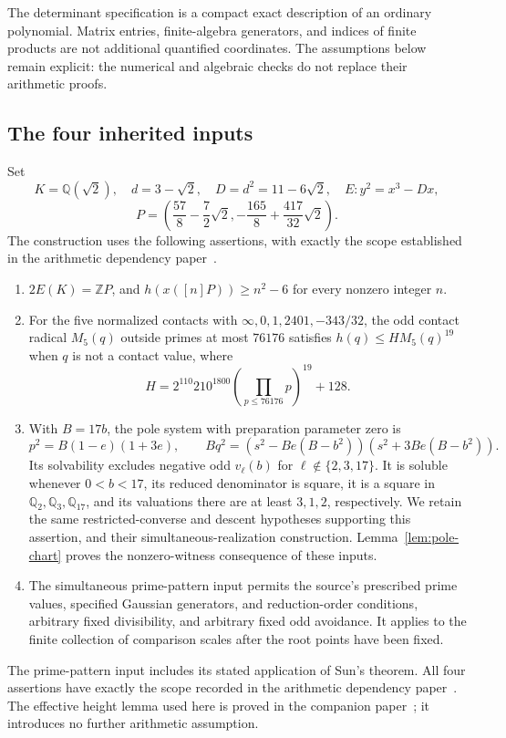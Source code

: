 \documentclass[11pt,a4paper]{article}
\newcommand{\Q}{\mathbb Q}\newcommand{\Z}{\mathbb Z}
\begin{document}
The determinant specification is a compact exact description of an
ordinary polynomial. Matrix entries, finite-algebra generators, and
indices of finite products are not additional quantified coordinates.
The assumptions below remain explicit: the numerical and algebraic
checks do not replace their arithmetic proofs.

\subsection{The four inherited inputs}\label{sec:inputs}

Set
\[
 K=\Q(\sqrt2),\quad d=3-\sqrt2,\quad D=d^2=11-6\sqrt2,
 \quad E:y^2=x^3-Dx,
\]
\[
 P=\left(\frac{57}{8}-\frac72\sqrt2,
          -\frac{165}{8}+\frac{417}{32}\sqrt2\right).
\]
The construction uses the following assertions, with exactly the
scope established in the arithmetic dependency paper~\cite{Dependencies}.
\begin{enumerate}
\item $2E(K)=\Z P$, and $h(x([n]P))\ge n^2-6$ for every
      nonzero integer $n$.
\item For the five normalized contacts with
      $\infty,0,1,2401,-343/32$, the odd contact radical
      $M_5(q)$ outside primes at most $76176$ satisfies
      $h(q)\le H M_5(q)^{19}$ when $q$ is not a contact value,
      where
\[
 H=2^{110}210^{1800}\left(\prod_{p\le76176}p\right)^{19}+128.
\]
\item With $B=17b$, the pole system with preparation parameter
      zero is
\[
 p^2=B(1-e)(1+3e),\qquad
 Bq^2=(s^2-Be(B-b^2))(s^2+3Be(B-b^2)).
\]
      Its solvability excludes negative odd $v_\ell(b)$ for
      $\ell\notin\{2,3,17\}$. It is soluble whenever
      $0<b<17$, its reduced denominator is square, it is a
      square in $\Q_2,\Q_3,\Q_{17}$, and its valuations there
      are at least $3,1,2$, respectively. We retain the same
      restricted-converse and descent hypotheses supporting this
      assertion, and their simultaneous-realization construction.
      Lemma~\ref{lem:pole-chart} proves the nonzero-witness
      consequence of these inputs.
\item The simultaneous prime-pattern input permits the source's
      prescribed prime values, specified Gaussian generators, and reduction-order
      conditions, arbitrary fixed divisibility, and arbitrary
      fixed odd avoidance. It applies to the finite collection
      of comparison scales after the root points have been fixed.
\end{enumerate}
The prime-pattern input includes its stated application of Sun's
theorem. All four assertions have exactly the scope recorded in the
arithmetic dependency paper~\cite{Dependencies}. The effective
height lemma used here is proved in the companion paper~\cite{Effective};
it introduces no further arithmetic assumption.
\end{document}
